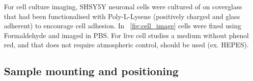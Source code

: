 For cell culture imaging, SHSY5Y neuronal cells were cultured of on coverglass that had been functionalised with Poly-L-Lysene (positively charged and glass adherent) to encourage cell adhesion.
In \figurename~\ref{fig:cell_image} cells were fixed using Formaldehyde and imaged in \gls{PBS}.
For live cell studies a medium without phenol red, and that does not require atmospheric control, should be used (ex. HEPES).

\subsection{Sample mounting and positioning}

